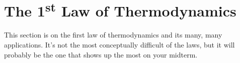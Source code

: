\section{\texorpdfstring{The 1\textsuperscript{st} Law of Thermodynamics}{The 1st Law of Thermodynamics}}
This section is on the first law of thermodynamics and its many, many applications. It's not the most conceptually difficult of the laws, but it will probably be the one that shows up the most on your midterm.






